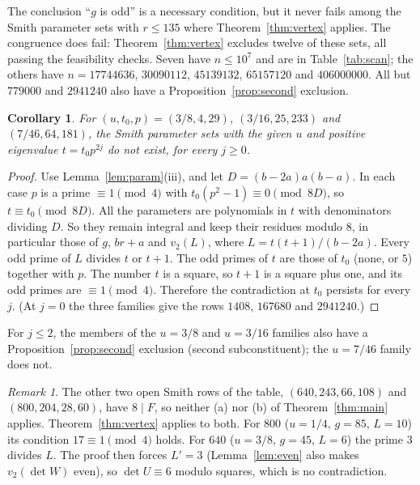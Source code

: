 \documentclass[11pt]{article}
\newtheorem{corollary}[theorem]{Corollary}
\theoremstyle{definition}
\theoremstyle{remark}
\newtheorem{remark}[theorem]{Remark}
\begin{document}
The conclusion ``$g$ is odd'' is a necessary condition, but it never fails
among the Smith parameter sets with $r\le135$ where Theorem~\ref{thm:vertex}
applies. The congruence does fail:
Theorem~\ref{thm:vertex} excludes twelve of these sets, all passing the
feasibility checks. Seven have $n\le10^7$ and are in Table~\ref{tab:scan};
the others have $n=17744636$, $30090112$, $45139132$, $65157120$ and
$406000000$. All but $779000$ and $2941240$ also have a
Proposition~\ref{prop:second} exclusion.

\begin{corollary}\label{cor:vertexfamilies}
For $(u,t_0,p)=(3/8,4,29)$, $(3/16,25,233)$ and $(7/46,64,181)$, the Smith
parameter sets with the given $u$ and positive eigenvalue $t=t_0p^{2j}$ do not
exist, for every $j\ge0$.
\end{corollary}

\begin{proof}
Use Lemma~\ref{lem:param}(iii), and let $D=(b-2a)a(b-a)$. In each case $p$
is a prime $\equiv1\pmod 4$ with $t_0(p^2-1)\equiv0\pmod{8D}$, so
$t\equiv t_0\pmod{8D}$. All the parameters are polynomials in $t$ with
denominators dividing $D$. So they remain integral and keep their
residues modulo $8$, in particular those of $g$, $br+a$ and $v_2(L)$, where
$L=t(t+1)/(b-2a)$. Every odd prime of $L$ divides $t$ or $t+1$. The odd primes
of $t$ are those of $t_0$ (none, or $5$) together with $p$. The number $t$ is a
square, so $t+1$ is a square plus one, and its odd primes are $\equiv1\pmod 4$.
Therefore the contradiction at $t_0$ persists for every $j$. (At $j=0$ the
three families give the rows $1408$, $167680$ and $2941240$.)
\end{proof}

For $j\le2$, the members of the $u=3/8$ and $u=3/16$ families also have a
Proposition~\ref{prop:second} exclusion (second subconstituent); the $u=7/46$
family does not.

\begin{remark}\label{rem:640}
The other two open Smith rows of the table, $(640,243,66,108)$ and
$(800,204,28,60)$, have $8\mid F$, so neither (a) nor (b) of Theorem~\ref{thm:main} applies.
Theorem~\ref{thm:vertex} applies to both. For $800$ ($u=1/4$, $g=85$, $L=10$)
its condition $17\equiv1\pmod4$ holds. For $640$ ($u=3/8$, $g=45$, $L=6$)
the prime $3$ divides $L$. The proof then forces $L'=3$ (Lemma~\ref{lem:even}
also makes $v_2(\det W)$ even), so $\det U\equiv6$ modulo squares, which is
no contradiction.
\end{remark}
\end{document}
